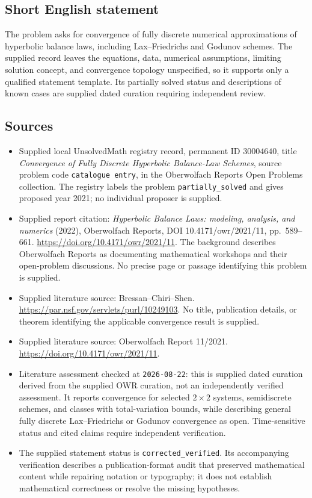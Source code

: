 \documentclass[11pt]{article}
\begin{document}
\subsection{Short English statement}
The problem asks for convergence of fully discrete numerical approximations of hyperbolic balance laws, including Lax--Friedrichs and Godunov schemes. The supplied record leaves the equations, data, numerical assumptions, limiting solution concept, and convergence topology unspecified, so it supports only a qualified statement template. Its partially solved status and descriptions of known cases are supplied dated curation requiring independent review.
\subsection{Sources}
\begin{itemize}
\item Supplied local UnsolvedMath registry record, permanent ID \(30004640\), title \emph{Convergence of Fully Discrete Hyperbolic Balance-Law Schemes}, source problem code \texttt{catalogue entry}, in the Oberwolfach Reports Open Problems collection. The registry labels the problem \texttt{partially\_solved} and gives proposed year 2021; no individual proposer is supplied.
\item Supplied report citation: \emph{Hyperbolic Balance Laws: modeling, analysis, and numerics} (2022), Oberwolfach Reports, DOI 10.4171/owr/2021/11, pp.\ 589--661. \url{https://doi.org/10.4171/owr/2021/11}. The background describes Oberwolfach Reports as documenting mathematical workshops and their open-problem discussions. No precise page or passage identifying this problem is supplied.
\item Supplied literature source: Bressan--Chiri--Shen. \url{https://par.nsf.gov/servlets/purl/10249103}. No title, publication details, or theorem identifying the applicable convergence result is supplied.
\item Supplied literature source: Oberwolfach Report 11/2021. \url{https://doi.org/10.4171/owr/2021/11}.
\item Literature assessment checked at \texttt{2026-08-22}: this is supplied dated curation derived from the supplied OWR curation, not an independently verified assessment. It reports convergence for selected \(2\times2\) systems, semidiscrete schemes, and classes with total-variation bounds, while describing general fully discrete Lax--Friedrichs or Godunov convergence as open. Time-sensitive status and cited claims require independent verification.
\item The supplied statement status is \texttt{corrected\_verified}. Its accompanying verification describes a publication-format audit that preserved mathematical content while repairing notation or typography; it does not establish mathematical correctness or resolve the missing hypotheses.
\end{itemize}
\end{document}
